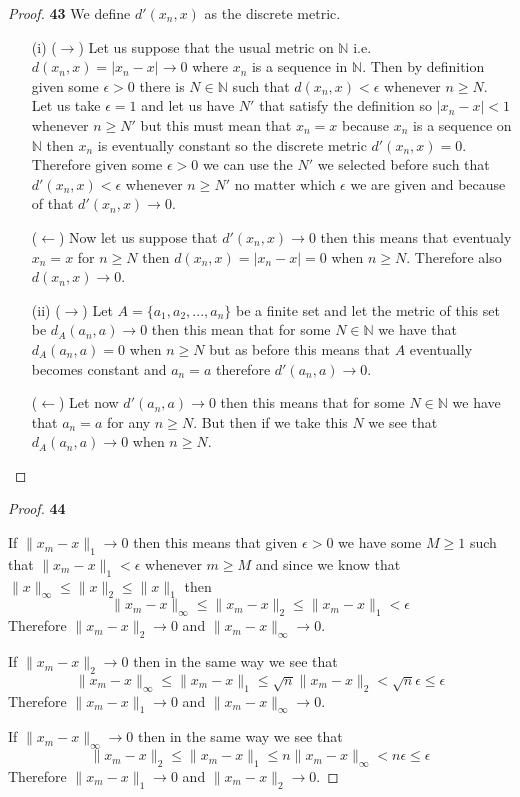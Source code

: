 \documentclass[11pt]{article}
\newcommand{\N}{\mathbb{N}}
\theoremstyle{definition}
\begin{document}
    \begin{proof}{\textbf{43}}
        We define $d'(x_n, x)$ as the discrete metric.
        \begin{itemize}
            \item [(i)]
        ($\rightarrow$)
        Let us suppose that the usual metric on $\N$ i.e.\\
        $d(x_n,x) = |x_n-x| \to 0$ where $x_n$ is a sequence in $\N$. Then by definition
        given some $\epsilon > 0$ there is $N\in \N$ such that $d(x_n, x) < \epsilon$
        whenever $n \geq N$. Let us take $\epsilon = 1$ and let us have $N'$ that satisfy
        the definition so $|x_n-x| < 1$ whenever $n \geq N'$ but this must mean that
        $x_n = x$ because $x_n$ is a sequence on $\N$ then $x_n$ is eventually constant
        so the discrete metric $d'(x_n, x) = 0$. Therefore given some $\epsilon > 0$
        we can use the $N'$ we selected before such that $d'(x_n,x)< \epsilon$ whenever
        $n \geq N'$ no matter which $\epsilon$ we are given and because of that
        $d'(x_n,x) \to 0$.

        ($\leftarrow$) Now let us suppose that $d'(x_n,x) \to 0$ then this means that
        eventualy $x_n = x$ for $n \geq N$ then $d(x_n,x) = |x_n - x| = 0$ when
        $n \geq N$. Therefore also $d(x_n,x) \rightarrow 0$.
        
        \item [(ii)]
        ($\rightarrow$) Let $A=\{a_1,a_2, ..., a_n\}$ be a finite set and let the
        metric of this set be $d_A(a_n,a) \to 0$ then this mean that for some $N \in \N$
        we have that $d_A(a_n,a) = 0$ when $n \geq N$ but as before this means that
        $A$ eventually becomes constant and $a_n = a$ therefore $d'(a_n,a) \to 0$.

        ($\leftarrow$) Let now $d'(a_n,a) \to 0$ then this means that for some $N \in \N$
        we have that $a_n = a$ for any $n \geq N$. But then if we take this $N$ we see
        that $d_A(a_n,a) \to 0$ when $n \geq N$.
        \end{itemize}
    \end{proof}
    \begin{proof}{\textbf{44}}

        If $\|x_m - x\|_1 \to 0$ then this means that
        given $\epsilon >0$ we have some $M \geq 1$ such that
        $\|x_m - x\|_1 < \epsilon$ whenever $m \geq M$ and since we know that
        $\|x\|_\infty \leq \|x\|_2 \leq \|x\|_1$ then
        $$\|x_m - x\|_\infty \leq \|x_m - x\|_2 \leq \|x_m - x\|_1 < \epsilon$$
        Therefore $\|x_m - x\|_2 \to 0$ and $\|x_m - x\|_\infty \to 0$.
        
        If $\|x_m - x\|_2 \to 0$ then in the same way we see that
        $$\|x_m - x\|_\infty \leq \|x_m - x\|_1 \leq \sqrt{n}\|x_m - x\|_2 <
        \sqrt{n}\epsilon \leq \epsilon$$
        Therefore $\|x_m - x\|_1 \to 0$ and $\|x_m - x\|_\infty \to 0$.

        If $\|x_m - x\|_\infty \to 0$ then in the same way we see that
        $$\|x_m - x\|_2 \leq \|x_m - x\|_1 \leq n\|x_m - x\|_\infty <
        n\epsilon \leq \epsilon$$
        Therefore $\|x_m - x\|_1 \to 0$ and $\|x_m - x\|_2 \to 0$.
    \end{proof}
\end{document}

